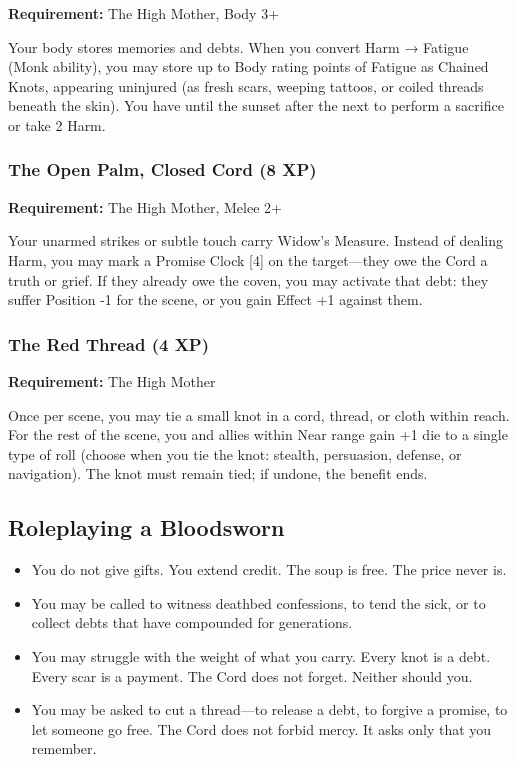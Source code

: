 \textbf{Requirement:} The High Mother, Body 3+

Your body stores memories and debts. When you convert Harm → Fatigue (Monk ability), you may store up to Body rating points of Fatigue as Chained Knots, appearing uninjured (as fresh scars, weeping tattoos, or coiled threads beneath the skin). You have until the sunset after the next to perform a sacrifice or take 2 Harm.

\subsubsection{The Open Palm, Closed Cord (8 XP)}

\textbf{Requirement:} The High Mother, Melee 2+

Your unarmed strikes or subtle touch carry Widow's Measure. Instead of dealing Harm, you may mark a Promise Clock [4] on the target—they owe the Cord a truth or grief. If they already owe the coven, you may activate that debt: they suffer Position -1 for the scene, or you gain Effect +1 against them.

\subsubsection{The Red Thread (4 XP)}

\textbf{Requirement:} The High Mother

Once per scene, you may tie a small knot in a cord, thread, or cloth within reach. For the rest of the scene, you and allies within Near range gain +1 die to a single type of roll (choose when you tie the knot: stealth, persuasion, defense, or navigation). The knot must remain tied; if undone, the benefit ends.

\subsection{Roleplaying a Bloodsworn}

\begin{itemize}
\item You do not give gifts. You extend credit. The soup is free. The price never is.
\item You may be called to witness deathbed confessions, to tend the sick, or to collect debts that have compounded for generations.
\item You may struggle with the weight of what you carry. Every knot is a debt. Every scar is a payment. The Cord does not forget. Neither should you.
\item You may be asked to cut a thread—to release a debt, to forgive a promise, to let someone go free. The Cord does not forbid mercy. It asks only that you remember.
\end{itemize}

